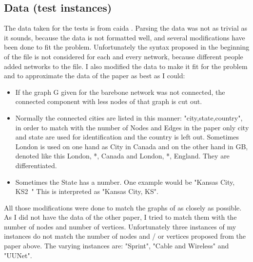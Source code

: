 \documentclass [12pt]{article}
\begin{document}
\subsection{Data (test instances)}
The data taken for the tests is from caida \cite{caidabarebones}. Parsing the
data was not as trivial as it sounds, because the data is not formatted well,
and several modifications have been done to fit the problem.
Unfortunately the syntax proposed in the beginning of the file is not considered
for each and every network, because different people added networks to the file.
I also modified the data to make it fit for the problem and to approximate the
data of the paper \cite{mirrorserver} as best as I could:
\begin{itemize}
  \item If the graph G given for the barebone network was not connected,
    the connected component with less nodes of that graph is cut out.
  \item Normally the connected cities are listed in this manner:
    "city,state,country", in order to match with the number of Nodes and Edges
    in the paper \cite{mirrorserver} only city and state are used for
    identification and the country is left out. Sometimes London
    is used on one hand as City in Canada and on the other hand in GB, denoted like this
    London, *, Canada and London, *, England. They are differentiated.
  \item Sometimes the State has a number. One example would be "Kansas City, KS2~"
    This is interpreted as "Kansas City, KS".
\end{itemize}

All those modifications were done to match the graphs of \cite{mirrorserver} as closely as possible.
As I did not have the data of the other paper, I tried to match them with the number of
nodes and number of vertices. Unfortunately three instances of my instances do not
match the number of nodes and / or vertices proposed from the paper above.
The varying instances are: "Sprint", "Cable and Wireless" and "UUNet".
\end{document}
